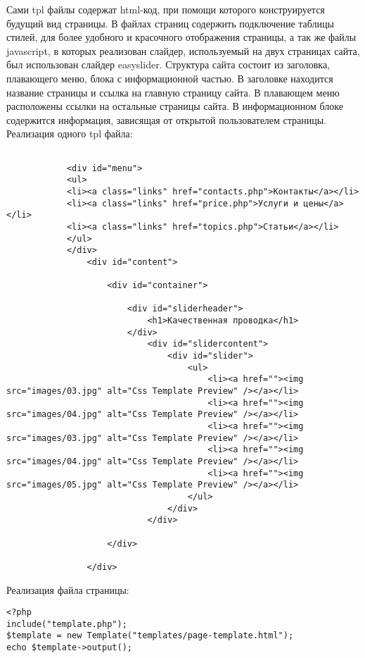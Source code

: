 Сами tpl файлы содержат html-код, при помощи которого конструируется будущий вид страницы.
В файлах страниц содержить подключение таблицы стилей, для более удобного и красочного отображения страницы, а так же файлы javascript, в которых реализован слайдер, используемый на двух страницах сайта, был использован слайдер easyslider.
Структура сайта состоит из заголовка, плавающего меню, блока с информационной частью.
В заголовке находится название страницы и ссылка на главную страницу сайта.
В плавающем меню расположены ссылки на остальные страницы сайта.
В информационном блоке содержится информация, зависящая от открытой пользователем страницы.
Реализация одного tpl файла:
\begin{verbatim}
	
			<div id="menu">
			<ul>
			<li><a class="links" href="contacts.php">Контакты</a></li>
			<li><a class="links" href="price.php">Услуги и цены</a></li>
			<li><a class="links" href="topics.php">Статьи</a></li>
			</ul>
			</div>
				<div id="content">
		
					<div id="container">

						<div id="sliderheader">
							<h1>Качественная проводка</h1>
						</div>
							<div id="slidercontent">
								<div id="slider">
									<ul>				
										<li><a href=""><img src="images/03.jpg" alt="Css Template Preview" /></a></li>
										<li><a href=""><img src="images/04.jpg" alt="Css Template Preview" /></a></li>
										<li><a href=""><img src="images/03.jpg" alt="Css Template Preview" /></a></li>
										<li><a href=""><img src="images/04.jpg" alt="Css Template Preview" /></a></li>
										<li><a href=""><img src="images/05.jpg" alt="Css Template Preview" /></a></li>			
									</ul>
								</div>
							</div>

					</div>

				</div>
\end{verbatim}
Реализация файла страницы:
\begin{verbatim}
<?php
include("template.php");
$template = new Template("templates/page-template.html");
echo $template->output();
\end{verbatim}